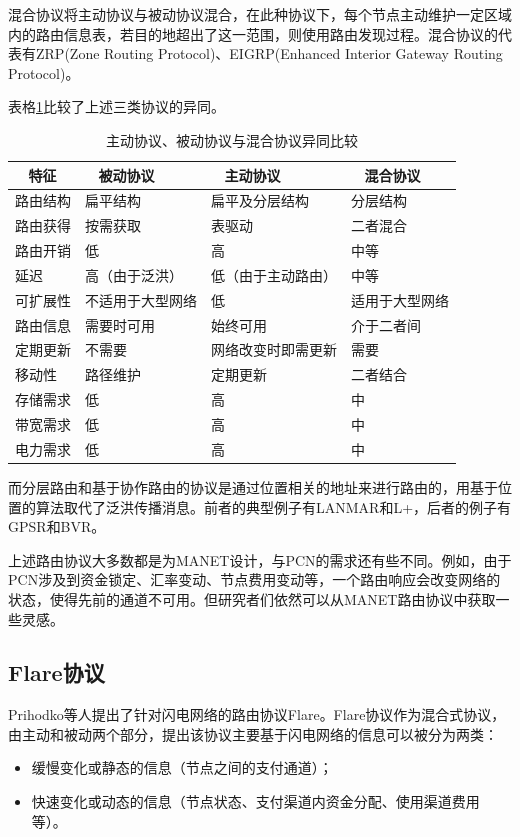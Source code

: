 \documentclass[12pt,a4paper]{article}
\begin{document}
混合协议将主动协议与被动协议混合，在此种协议下，每个节点主动维护一定区域内的路由信息表，若目的地超出了这一范围，则使用路由发现过程。混合协议的代表有ZRP(Zone Routing Protocol)、EIGRP(Enhanced Interior Gateway Routing Protocol)。

表格\ref{protocols}比较了上述三类协议的异同。

\begin{table}[htb]
\renewcommand\arraystretch{1.2}
\caption{主动协议、被动协议与混合协议异同比较}
\centering
\begin{tabular}{l l l l}
\label{protocols}
\\
\hline
\hline
~ \textbf{特征} ~ & ~ \textbf{被动协议} ~ & ~ \textbf{主动协议} ~ & ~ \textbf{混合协议} \\[6pt]
\hline
路由结构  & 扁平结构 & 扁平及分层结构 & 分层结构 \\[6pt]
\hline
路由获得 & 按需获取 & 表驱动 & 二者混合
\\[6pt]
\hline
路由开销 & 低 & 高 & 中等
\\[6pt]
\hline
延迟 & 高（由于泛洪） & 低（由于主动路由） & 中等
\\[6pt]
\hline
可扩展性 & 不适用于大型网络 & 低 & 适用于大型网络
\\[6pt]
\hline
路由信息 & 需要时可用 & 始终可用 & 介于二者间
\\[6pt]
\hline
定期更新 & 不需要 & 网络改变时即需更新 & 需要
\\[6pt]
\hline
移动性 & 路径维护 & 定期更新 & 二者结合
\\[6pt]
\hline
存储需求 & 低 & 高 & 中
\\[6pt]
\hline
带宽需求 & 低 & 高 & 中
\\[6pt]
\hline
电力需求 & 低 & 高 & 中
\\[6pt]
\hline
\hline
\end{tabular}
\end{table}

而分层路由和基于协作路由的协议是通过位置相关的地址来进行路由的，用基于位置的算法取代了泛洪传播消息。前者的典型例子有LANMAR\cite{Guangyu}和L+\cite{mitton2005distributed}，后者的例子有GPSR\cite{Karp2000}和BVR\cite{fonseca2005beacon}。

上述路由协议大多数都是为MANET设计，与PCN的需求还有些不同。例如，由于PCN涉及到资金锁定、汇率变动、节点费用变动等，一个路由响应会改变网络的状态，使得先前的通道不可用。但研究者们依然可以从MANET路由协议中获取一些灵感。

\clearpage

\subsection{Flare协议}
Prihodko等人提出了针对闪电网络的路由协议Flare\cite{prihodko2016flare}。Flare协议作为混合式协议，由主动和被动两个部分，提出该协议主要基于闪电网络的信息可以被分为两类：
\begin{itemize}
	\item 缓慢变化或静态的信息（节点之间的支付通道）；
	\item 快速变化或动态的信息（节点状态、支付渠道内资金分配、使用渠道费用等）。
\end{itemize}
\end{document}
